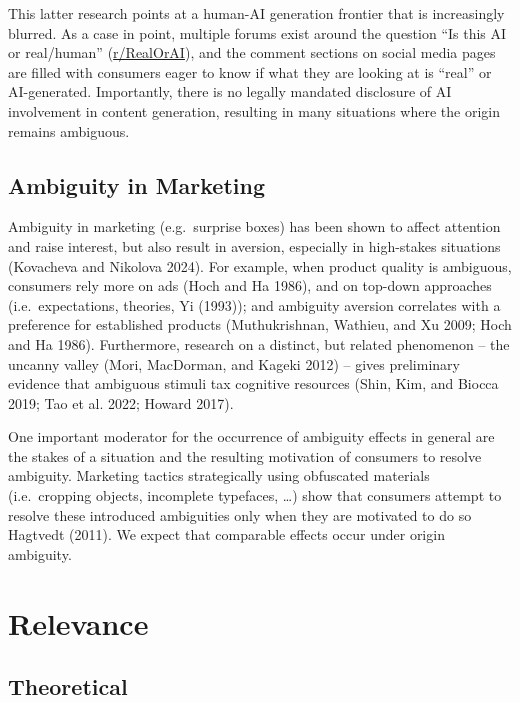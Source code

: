 \documentclass[
  letterpaper,
  DIV=11,
  numbers=noendperiod]{scrartcl}
\begin{document}
This latter research points at a human-AI generation frontier that is
increasingly blurred. As a case in point, multiple forums exist around
the question ``Is this AI or real/human''
(\href{https://www.reddit.com/r/RealOrAI/}{r/RealOrAI}), and the comment
sections on social media pages are filled with consumers eager to know
if what they are looking at is ``real'' or AI-generated. Importantly,
there is no legally mandated disclosure of AI involvement in content
generation, resulting in many situations where the origin remains
ambiguous.

\subsection{Ambiguity in Marketing}\label{ambiguity-in-marketing}

Ambiguity in marketing (e.g.~surprise boxes) has been shown to affect
attention and raise interest, but also result in aversion, especially in
high-stakes situations (Kovacheva and Nikolova 2024). For example, when
product quality is ambiguous, consumers rely more on ads (Hoch and Ha
1986), and on top-down approaches (i.e.~expectations, theories, Yi
(1993)); and ambiguity aversion correlates with a preference for
established products (Muthukrishnan, Wathieu, and Xu 2009; Hoch and Ha
1986). Furthermore, research on a distinct, but related phenomenon --
the uncanny valley (Mori, MacDorman, and Kageki 2012) -- gives
preliminary evidence that ambiguous stimuli tax cognitive resources
(Shin, Kim, and Biocca 2019; Tao et al. 2022; Howard 2017).

One important moderator for the occurrence of ambiguity effects in
general are the stakes of a situation and the resulting motivation of
consumers to resolve ambiguity. Marketing tactics strategically using
obfuscated materials (i.e.~cropping objects, incomplete typefaces,
\ldots) show that consumers attempt to resolve these introduced
ambiguities only when they are motivated to do so Hagtvedt (2011). We
expect that comparable effects occur under origin ambiguity.

\section{Relevance}\label{relevance}

\subsection{Theoretical}\label{theoretical}
\end{document}
